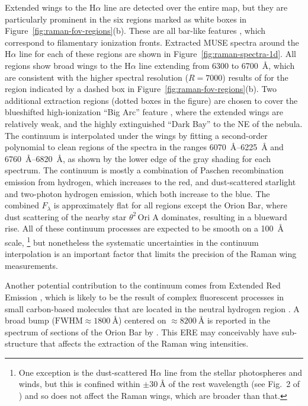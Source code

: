 \documentclass[useAMS, usenatbib, a4paper]{mnras}
\def\th#1#2{\ensuremath{\theta^{#1}\,\text{Ori~#2}}}
\newcommand\ha{\ensuremath{\text{H}\alpha}}
\begin{document}
Extended wings to the \ha{} line are detected over the entire map, but
they are particularly prominent in the six regions marked as white
boxes in Figure~\ref{fig:raman-fov-regions}(b).  These are all
bar-like features \citep{ODell:2000a, Garcia-Diaz:2007a}, which
correspond to filamentary ionization fronts.  Extracted MUSE spectra
around the \ha{} line for each of these regions are shown in
Figure~\ref{fig:raman-spectra-1d}.  All regions show broad wings to
the \ha{} line extending from \num{6300} to \SI{6700}{\angstrom},
which are consistent with the higher spectral resolution
(\(R = 7000\)) results of \citet{Dopita:2016a} for the region
indicated by a dashed box in Figure~\ref{fig:raman-fov-regions}(b).
Two additional extraction regions (dotted boxes in the figure) are chosen
to cover the blueshifted high-ionization ``Big Arc'' feature
\citep{Doi:2004a},
where the extended wings are relatively weak,
and the highly extinguished ``Dark Bay'' to the NE of the nebula.
The continuum is interpolated under the wings by fitting a
second-order polynomial to clean regions of the spectra in the ranges
\SIrange{6070}{6225}{\angstrom} and \SIrange{6760}{6820}{\angstrom},
as shown by the lower edge of the gray shading for each spectrum.  The
continuum is mostly a combination of Paschen recombination emission from
hydrogen, which increases to the red, and dust-scattered starlight and
two-photon hydrogen emission, which both increase to the blue.  The
combined \(F_\lambda\) is approximately flat for all regions except the
Orion Bar, where dust scattering of the nearby star \th2A{} dominates,
resulting in a blueward rise.
All of these continuum processes are
expected to be smooth on a \SI{100}{\angstrom} scale,%
\footnote{One exception is the dust-scattered \ha{} line from the stellar
  photospheres and winds, but this is confined within
  \(\pm \SI{30}{\angstrom}\) of the rest wavelength (see Fig.~2 of
  \citealp{Simon-Diaz:2006b}) and so does not affect the Raman wings,
  which are broader than that.}  but nonetheless the systematic
uncertainties in the continuum interpolation is an important factor
that limits the precision of the Raman wing measurements.

Another potential contribution to the continuum comes from 
Extended Red Emission \citetext{ERE; \citealp{Schmidt:1980a}},
which is likely to be the result of complex fluorescent processes in small carbon-based molecules
\citep{Witt:2020a} that are located in the neutral hydrogen region
\citep{Lai:2017a}.
A broad bump (\(\text{FWHM} \approx \SI{1800}{\angstrom}\)) centered on \(\approx \SI{8200}{\angstrom}\)
is reported in the spectrum of sections of the Orion Bar by \citet{Perrin:1992a}.
This ERE may conceivably have sub-structure that affects the extraction of the Raman wing intensities.
\end{document}
